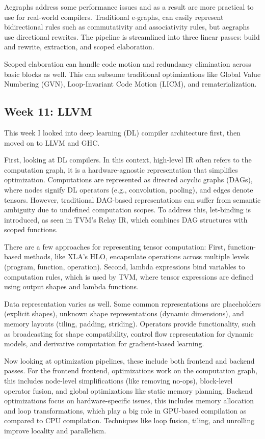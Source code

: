\documentclass[11pt, a4paper, titlepage]{article}
\begin{document}
Aegraphs address some performance issues and as a result are more practical to use for real-world compilers.
Traditional e-graphs, can easily represent bidirectional rules such as commutativity and associativity rules,
but aegraphs use directional rewrites.
The pipeline is streamlined into three linear passes: build and rewrite, extraction, and scoped elaboration.

Scoped elaboration can handle code motion and redundancy elimination across basic blocks as well. This can subsume traditional optimizations like Global Value Numbering (GVN), Loop-Invariant Code Motion (LICM), and rematerialization.

\subsection{Week 11: LLVM}

This week I looked into deep learning (DL) compiler architecture first, then moved on to LLVM and GHC.

First, looking at DL compilers.
In this context, high-level IR often refers to the computation graph,
it is a hardware-agnostic representation that simplifies optimization.
Computations are represented as directed acyclic graphs (DAGs),
where nodes signify DL operators (e.g., convolution, pooling), and edges denote tensors.
However, traditional DAG-based representations can suffer from semantic ambiguity due to undefined computation scopes.
To address this, let-binding is introduced, as seen in TVM's Relay IR, which combines DAG structures with scoped functions.

There are a few approaches for representing tensor computation:
First, function-based methods, like XLA's HLO, encapsulate operations across multiple levels (program, function, operation).
Second, lambda expressions bind variables to computation rules, which is used by TVM, where tensor expressions are defined using output shapes and lambda functions.

Data representation varies as well.
Some common representations are placeholders (explicit shapes),
unknown shape representations (dynamic dimensions), and memory layouts (tiling, padding, striding).
Operators provide functionality, such as broadcasting for shape compatibility,
control flow representation for dynamic models, and derivative computation for gradient-based learning.

Now looking at optimization pipelines, these include both frontend and backend passes.
For the frontend frontend, optimizations work on the computation graph,
this includes node-level simplifications (like removing no-ops),
block-level operator fusion, and global optimizations like static memory planning.
Backend optimizations focus on hardware-specific issues, this includes memory allocation and loop transformations,
which play a big role in GPU-based compilation as compared to CPU compilation.
Techniques like loop fusion, tiling, and unrolling improve locality and parallelism.
\end{document}
